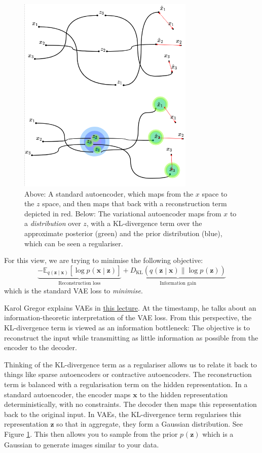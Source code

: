 \documentclass{article}
\newcommand{\prob}[3]{{#1}_{#2} \left( #3 \right)}
\newcommand{\condprob}[4]{{#1}_{#2} \left( #3 \middle| #4 \right)}
\newcommand{\expected}[2]{\mathbb{E}_{#1}\left[ #2 \right]}
\newcommand{\KL}[2]{D_{\mathrm{KL}}\left( #1 \| #2 \right)}
\newcommand{\x}{\mathbf{x}}
\newcommand{\z}{\mathbf{z}}
\begin{document}
\begin{figure}
\begin{center}
\includegraphics[width=0.75\textwidth]{figures/autoencoder_vs_vae.png}
\end{center}
\label{fig:ae_vs_vae}
\caption{Above: A standard autoencoder, which maps from the $x$ space to the $z$ space, and then maps that back with a reconstruction term depicted in red. Below: The variational autoencoder maps from $x$ to a \emph{distribution} over $z$, with a KL-divergence term over the approximate posterior (green) and the prior distribution (blue), which can be seen a regulariser.}
\end{figure}
For this view, we are trying to minimise the following objective:
$$\underbrace{-\expected{\condprob{q}{}{\z}{\x}}{\log \condprob{p}{}{\x}{\z}}}_\text{
 Reconstruction loss}
+ \underbrace{\KL{\condprob{q}{}{\z}{\x}}{\log \prob{p}{}{\z}}}_\text{
 Information gain
}$$
which is the standard VAE loss to \emph{minimise}.

Karol Gregor explains VAEs in \href{https://youtu.be/P78QYjWh5sM?t=207}{this lecture}. At the timestamp, he talks about an information-theoretic interpretation of the VAE loss. From this perspective, the KL-divergence term is viewed as an information bottleneck: The objective is to reconstruct the input while transmitting as little information as possible from the encoder to the decoder.


Thinking of the KL-divergence term as a regulariser allows us to relate it back to things like sparse autoencoders or contractive autoencoders. The reconstruction term is balanced with a regularisation term on the hidden representation. In a standard autoencoder, the encoder maps $\x$ to the hidden representation deterministically, with no constraints. The decoder then maps this representation back to the original input. In VAEs, the KL-divergence term regularises this representation $\z$ so that in aggregate, they form a Gaussian distribution. See Figure \ref{fig:ae_vs_vae}. This then allows you to sample from the prior $\prob{p}{}{\z}$ which is a Gaussian to generate images similar to your data.
\end{document}
